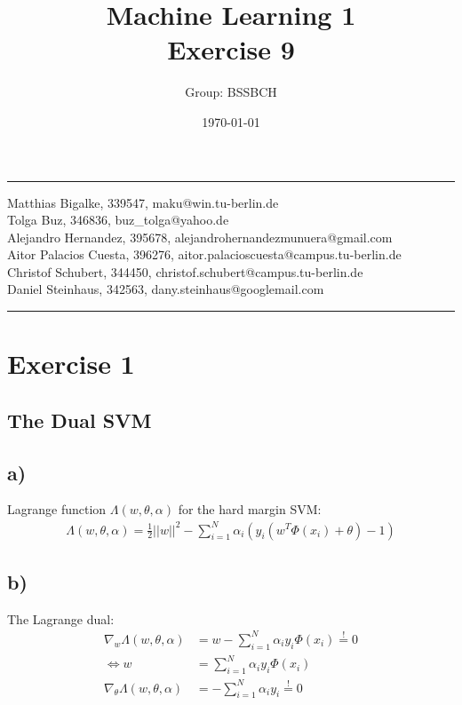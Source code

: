\documentclass{article}
\title{Machine Learning 1 \\ Exercise 9} %
\author{Group: BSSBCH} %
\date{\today} %
\begin{document}
\maketitle %
\noindent\rule[0.5ex]{\linewidth}{1pt}
Matthias Bigalke, 339547, maku@win.tu-berlin.de \\
Tolga Buz, 346836, buz\_tolga@yahoo.de \\
Alejandro Hernandez, 395678, alejandrohernandezmunuera@gmail.com \\
Aitor Palacios Cuesta, 396276, aitor.palacioscuesta@campus.tu-berlin.de \\
Christof Schubert, 344450, christof.schubert@campus.tu-berlin.de \\
Daniel Steinhaus, 342563, dany.steinhaus@googlemail.com\\
\noindent\rule[0.5ex]{\linewidth}{1pt}


\section*{Exercise 1}

\subsection*{The Dual SVM}

\subsection*{a)}

Lagrange function $\Lambda(w, \theta, \alpha)$ for the hard margin SVM: \\
\begin{align}
    \Lambda(w,\theta ,\alpha) = \frac{1}{2} ||w||^2 - \sum_{i=1}^N \alpha_i(y_i(w^T \Phi(x_i) + \theta)-1)
\end{align}

\subsection*{b)}
The Lagrange dual:
\begin{align}
    \nabla_w\Lambda(w,\theta,\alpha)&=w-\sum_{i=1}^N \alpha_i y_i \Phi(x_i) \stackrel{!}{=} 0\\
    \Longleftrightarrow w &= \sum_{i=1}^N \alpha_i y_i \Phi(x_i) ~~~~~~ \\
    \nabla_\theta \Lambda(w,\theta,\alpha) &= - \sum_{i=1}^N \alpha_i y_i \stackrel{!}{=} 0
\end{align}
\end{document}
